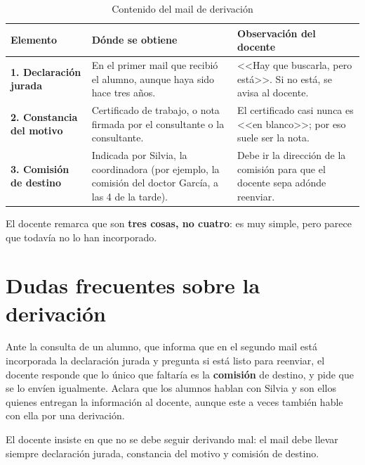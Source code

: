 \documentclass[12pt,oneside]{book}
\begin{document}
\begin{table}[H]
\centering
\caption{Contenido del mail de derivación}
\begin{tabularx}{\textwidth}{
    >{\raggedright\arraybackslash}p{}
    >{\raggedright\arraybackslash}X
    >{\raggedright\arraybackslash}X
}
\toprule
\textbf{Elemento} & \textbf{Dónde se obtiene} & \textbf{Observación del docente} \\
\midrule
\textbf{1. Declaración jurada} &
En el primer mail que recibió el alumno, aunque haya sido hace tres años. &
<<Hay que buscarla, pero está>>. Si no está, se avisa al docente. \\
\addlinespace
\textbf{2. Constancia del motivo} &
Certificado de trabajo, o nota firmada por el consultante o la consultante. &
El certificado casi nunca es <<en blanco>>; por eso suele ser la nota. \\
\addlinespace
\textbf{3. Comisión de destino} &
Indicada por Silvia, la coordinadora (por ejemplo, la comisión del doctor García, a las 4 de la tarde). &
Debe ir la dirección de la comisión para que el docente sepa adónde reenviar. \\
\bottomrule
\end{tabularx}
\end{table}

El docente remarca que son \textbf{tres cosas, no cuatro}: es muy simple, pero parece que todavía no lo han incorporado.

\section{Dudas frecuentes sobre la derivación}

Ante la consulta de un alumno, que informa que en el segundo mail está incorporada la declaración jurada y pregunta si está listo para reenviar, el docente responde que lo único que faltaría es la \textbf{comisión} de destino, y pide que se lo envíen igualmente. Aclara que los alumnos hablan con Silvia y son ellos quienes entregan la información al docente, aunque este a veces también hable con ella por una derivación.


\begin{important}
El docente insiste en que no se debe seguir derivando mal: el mail debe llevar siempre declaración jurada, constancia del motivo y comisión de destino.
\end{important}
\end{document}
